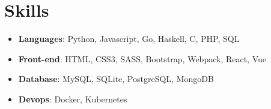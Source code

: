 \documentclass[letterpaper,11pt]{article}
\newcommand{\resumeItem}[2]{
  \item\small{
    \textbf{#1}{: #2 \vspace{-2pt}}
  }
}
\newcommand{\resumeSubItem}[2]{\resumeItem{#1}{#2}\vspace{-4pt}}
\newcommand{\resumeSubHeadingListStart}{\begin{itemize}[leftmargin=*]}
\newcommand{\resumeSubHeadingListEnd}{\end{itemize}}
\begin{document}
%
\section{Skills}
 \resumeSubHeadingListStart
   \resumeSubItem{Languages}
     {Python, Javascript, Go, Haskell, C, PHP, SQL}
   \resumeSubItem{Front-end}
     {HTML, CSS3, SASS, Bootstrap, Webpack, React, Vue}
   \resumeSubItem{Database}
     {MySQL, SQLite, PostgreSQL, MongoDB}
   \resumeSubItem{Devops}
     {Docker, Kubernetes}
 \resumeSubHeadingListEnd




\end{document}

